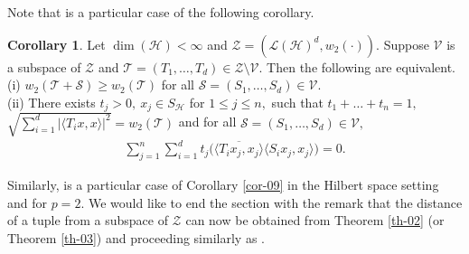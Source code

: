 \documentclass{amsart}
\theoremstyle{definition}
\newtheorem{cor}[theorem]{Corollary}
\theoremstyle{remark}
\numberwithin{equation}{section}
\begin{document}
Note that \cite[Th. 1.2]{GS} is a particular case of the following corollary.
\begin{cor}\label{cor-08}
	Let $\dim(\mathcal{H})<\infty$ and $\mathcal{Z}=(\mathcal{L}(\mathcal{H})^d,w_2(\cdot)).$ Suppose $\mathcal{V}$ is a subspace  of $\mathcal{Z}$ and $\mathcal{T}=(T_1,\ldots,T_d)\in \mathcal{Z}\setminus \mathcal{V}.$ Then the following are equivalent.\\
	\rm(i) $w_2(\mathcal{T}+\mathcal{S})\geq w_2(\mathcal{T})$  for all $\mathcal{S}=(S_1,\ldots,S_d)\in \mathcal{V}.$ \\
	\rm(ii) There exists $t_j>0, ~x_j\in S_{\mathcal{H}}$ for $1\leq j\leq n,$ such that  $t_1+\ldots+t_n=1,$ $ \sqrt{\sum_{i=1}^d|\langle T_ix,x\rangle|^2}=w_2(\mathcal{T})$ and  for all $\mathcal{S}=(S_1,\ldots,S_d)\in \mathcal{V},$
	\begin{eqnarray*}
		\sum_{j=1}^n\sum_{i=1}^dt_j\bigg(\overline{\langle T_ix_j, x_j\rangle }\langle S_ix_j, x_j\rangle \bigg)=0.
	\end{eqnarray*}
\end{cor}
Similarly, \cite[Th. 1.3]{GS} is a particular case of Corollary \ref{cor-09} in the Hilbert space setting and for $p=2.$ We would like to end the section with the remark that the distance of a tuple from a subspace of $\mathcal{Z}$ can now be obtained from Theorem \ref{th-02}  (or Theorem \ref{th-03}) and  \cite[Th. 2.1]{MP22} proceeding similarly as \cite[Th. 3.5]{M2}.
\end{document}
